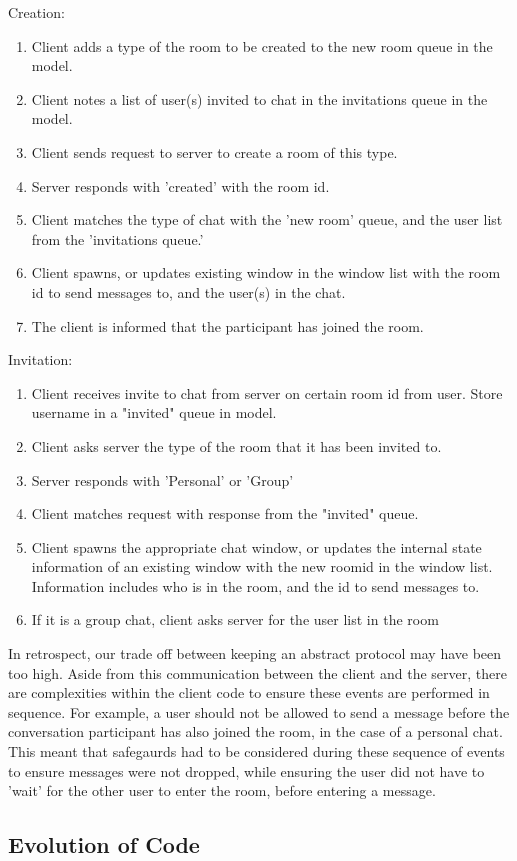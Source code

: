 Creation:
\begin{enumerate}
\item Client adds a type of the room to be created to the new room queue in the model.
\item Client notes a list of user(s) invited to chat in the invitations queue in the model.
\item Client sends request to server to create a room of this type.
\item Server responds with 'created' with the room id.
\item Client matches the type of chat with the 'new room' queue, and the user list from the 'invitations queue.'
\item Client spawns, or updates existing window in the window list with the room id to send messages to, and the user(s) in the chat.
\item The client is informed that the participant has joined the room.
\end{enumerate}

Invitation:
\begin{enumerate}
\item Client receives invite to chat from server on certain room id from user. Store username in a "invited" queue in model.  
\item Client asks server the type of the room that it has been invited to. 
\item Server responds with 'Personal' or 'Group'
\item Client matches request with response from the "invited" queue.
\item Client spawns the appropriate chat window, or updates the internal state information of an existing window with the new roomid in the window list. Information includes who is in the room, and the id to send messages to.
\item If it is a group chat, client asks server for the user list in the room
\end{enumerate}

In retrospect, our trade off between keeping an abstract protocol may have been too high. Aside from this communication between the client and the server, there are complexities within the client code to ensure these events are performed in sequence. For example, a user should not be allowed to send a message before the conversation participant has also joined the room, in the case of a personal chat. This meant that safegaurds had to be considered during these sequence of events to ensure messages were not dropped, while ensuring the user did not have to 'wait' for the other user to enter the room, before entering a message. 





\subsection{Evolution of Code}
